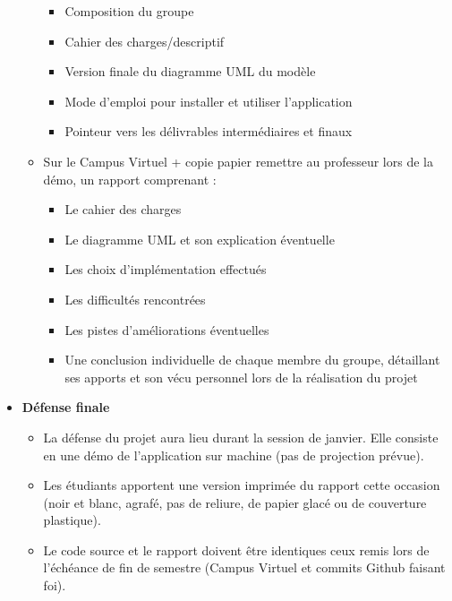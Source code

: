 \begin{itemize}
\begin{itemize}
         \begin{itemize}
             \item Composition du groupe
             \item Cahier des charges/descriptif
             \item Version finale du diagramme UML du modèle
             \item Mode d’emploi pour installer et utiliser l’application
             \item Pointeur vers les délivrables intermédiaires et finaux
         \end{itemize}
         \clearpage
         \item Sur le Campus Virtuel + copie papier remettre au professeur lors de la démo, un rapport comprenant :
         \begin{itemize}
             \item Le cahier des charges
             \item Le diagramme UML et son explication éventuelle
             \item Les choix d’implémentation effectués
             \item Les difficultés rencontrées
             \item Les pistes d’améliorations éventuelles
             \item Une conclusion individuelle de chaque membre du groupe, détaillant ses apports et son vécu personnel lors de la réalisation du projet
         \end{itemize}
     \end{itemize}
     \item \textbf{Défense finale}
     \begin{itemize}
         \item La défense du projet aura lieu durant la session de janvier. Elle consiste en une démo de l’application sur machine (pas de projection prévue).
         \item Les étudiants apportent une version imprimée du rapport cette occasion (noir et blanc, agrafé, pas de reliure, de papier glacé ou de couverture plastique).
         \item Le code source et le rapport doivent être identiques ceux remis lors de l’échéance de fin de semestre (Campus Virtuel et commits Github faisant foi).
     \end{itemize}
\end{itemize}


